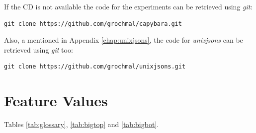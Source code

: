 \documentclass[11pt,a4paper,draft]{report}
\begin{document}
If the CD is not available the code for the experiments can be retrieved using
\emph{git}:

\begin{verbatim}
git clone https://github.com/grochmal/capybara.git
\end{verbatim}

Also, a mentioned in Appendix \ref{chap:unixjsons}, the code for
\emph{unixjsons} can be retrieved using \emph{git} too:

\begin{verbatim}
git clone https://github.com/grochmal/unixjsons.git
\end{verbatim}

\chapter{Feature Values}
\label{chap:glossary}

Tables \ref{tab:glossary}, \ref{tab:bigtop} and \ref{tab:bigbot}.
\end{document}

